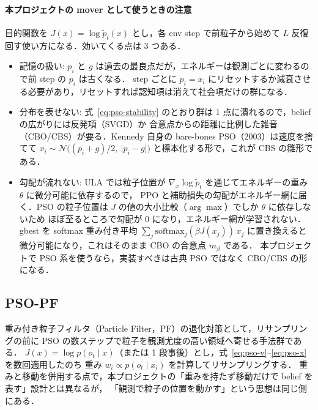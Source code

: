 \documentclass[a4paper,11pt]{article}
\newcommand{\ptil}{\tilde p_t}
\begin{document}
{\paragraph{本プロジェクトの mover として使うときの注意}
目的関数を $J(x) = \log \ptil(x)$ とし，各 env step で前粒子から始めて $L$ 反復回す使い方になる．効いてくる点は 3 つある．
\begin{itemize}
  \item 記憶の扱い: $p_i$ と $g$ は過去の最良点だが，エネルギーは観測ごとに変わるので前 step の $p_i$ は古くなる．
        step ごとに $p_i = x_i$ にリセットするか減衰させる必要があり，リセットすれば認知項は消えて社会項だけの群になる．
  \item 分布を表せない: 式~\eqref{eq:pso-stability} のとおり群は 1 点に潰れるので，belief の広がりには反発項（SVGD）か
        合意点からの距離に比例した雑音（CBO/CBS）が要る．Kennedy 自身の bare-bones PSO（2003）は速度を捨てて
        $x_i \sim \mathcal N\big((p_i + g)/2,\ \lvert p_i - g \rvert\big)$ と標本化する形で，これが CBS の雛形である．
  \item 勾配が流れない: ULA では粒子位置が $\nabla_x \log \ptil$ を通じてエネルギーの重み $\theta$ に微分可能に依存するので，
        PPO と補助損失の勾配がエネルギー網に届く．PSO の粒子位置は $J$ の値の大小比較（$\arg\max$）でしか $\theta$ に依存しないため
        ほぼ至るところで勾配が 0 になり，エネルギー網が学習されない．
        gbest を softmax 重み付き平均 $\sum_j \mathrm{softmax}_j(\beta J(x_j))\, x_j$ に置き換えると微分可能になり，これはそのまま CBO の合意点 $m_\beta$ である．
        本プロジェクトで PSO 系を使うなら，実装すべきは古典 PSO ではなく CBO/CBS の形になる．
\end{itemize}
}

\subsection{PSO-PF}
重み付き粒子フィルタ（Particle Filter，PF）の退化対策として，リサンプリングの前に PSO の数ステップで粒子を観測尤度の高い領域へ寄せる手法群である．
$J(x) = \log p(o_t \mid x)$（または 1 段事後）とし，式~\eqref{eq:pso-v}--\eqref{eq:pso-x} を数回適用したのち
重み $w_i \propto p(o_t \mid x_i)$ を計算してリサンプリングする．
重みと移動を併用する点で，本プロジェクトの「重みを持たず移動だけで belief を表す」設計とは異なるが，
「観測で粒子の位置を動かす」という思想は同じ側にある．
\end{document}
